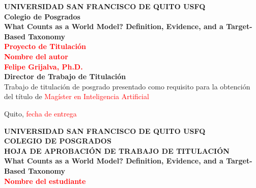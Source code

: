 \IfFileExists{IEEEtran.cls}{\documentclass[journal]{IEEEtran}}{\documentclass[twocolumn]{article}}
\author{}
\date{}
\begin{document}
\onecolumn
\thispagestyle{empty} %

\begin{center}
\textbf{\fontsize{14}{16}\selectfont UNIVERSIDAD SAN FRANCISCO DE QUITO USFQ}\\
\vspace{25pt}
\textbf{\fontsize{14}{16}\selectfont Colegio de Posgrados}\\
\vspace{50pt}
\textbf{\fontsize{14}{16}\selectfont What Counts as a World Model? Definition, Evidence, and a Target-Based Taxonomy}\\
\vspace{40pt}
\textbf{\fontsize{14}{16}\selectfont \textcolor{red}{Proyecto de Titulación}}\\
\vspace{50pt}
\textbf{\fontsize{18}{20}\selectfont \textcolor{red}{Nombre del autor}}\\
\vspace{50pt}
\textbf{\fontsize{16}{18}\selectfont \textcolor{red}{Felipe Grijalva, Ph.D.}}\\
\vspace{15pt}
\textbf{\fontsize{16}{18}\selectfont Director de Trabajo de Titulación}\\
\vspace{50pt}
\fontsize{12}{14}\selectfont Trabajo de titulación de posgrado presentado como requisito para la obtención del título de \textcolor{red}{Magíster en Inteligencia Artificial}
\vspace{20pt}
\end{center}

\begin{center}
\fontsize{12}{14}\selectfont Quito, \textcolor{red}{fecha de entrega}
\end{center}

\newpage

\begin{center}
\textbf{\fontsize{18}{16}\selectfont UNIVERSIDAD SAN FRANCISCO DE QUITO USFQ}\\
\vspace{10pt}
\textbf{\fontsize{18}{16}\selectfont COLEGIO DE POSGRADOS}\\
\vspace{20pt}
\textbf{\fontsize{14}{16}\selectfont HOJA DE APROBACIÓN DE TRABAJO DE TITULACIÓN}\\
\vspace{10pt}
\textbf{\fontsize{14}{16}\selectfont What Counts as a World Model? Definition, Evidence, and a Target-Based Taxonomy}\\
\vspace{10pt}
\textbf{\fontsize{14}{16}\selectfont \textcolor{red}{Nombre del estudiante}}
\end{center}
\vspace{20pt}
\end{document}
